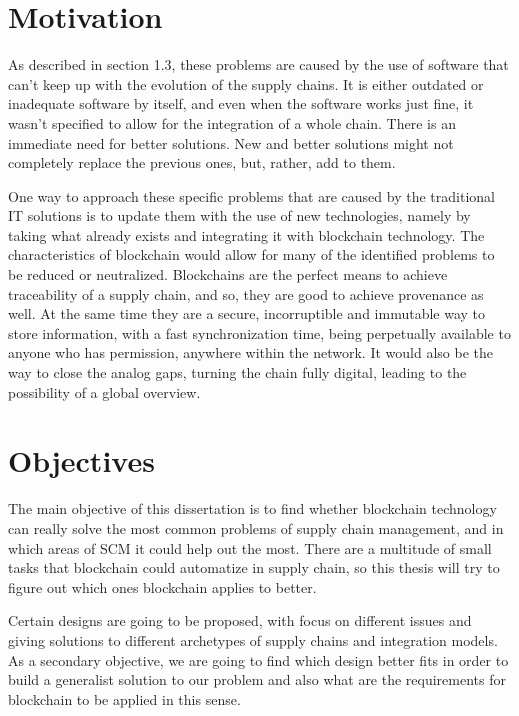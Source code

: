 
\section{Motivation} \label{sec:motivation}

As described in section 1.3, these problems are caused by the use of software that can't keep up with the evolution of the supply chains. It is either outdated or inadequate software by itself, and even when the software works just fine, it wasn't specified to allow for the integration of a whole chain. There is an immediate need for better solutions. New and better solutions might not completely replace the previous ones, but, rather, add to them.

One way to approach these specific problems that are caused by the traditional IT solutions is to update them with the use of new technologies, namely by taking what already exists and integrating it with blockchain technology. The characteristics of blockchain would allow for many of the identified problems to be reduced or neutralized. Blockchains are the perfect means to achieve traceability of a supply chain, and so, they are good to achieve provenance as well. At the same time they are a secure, incorruptible and immutable way to store information, with a fast synchronization time, being perpetually available to anyone who has permission, anywhere within the network. It would also be the way to close the analog gaps, turning the chain fully digital, leading to the possibility of a global overview.

\section{Objectives}
\label{sec:objectives}
The main objective of this dissertation is to find whether blockchain technology can really solve the most common problems of supply chain management, and in which areas of SCM it could help out the most. There are a multitude of small tasks that blockchain could automatize in supply chain, so this thesis will try to figure out which ones blockchain applies to better. 

Certain designs are going to be proposed, with focus on different issues and giving solutions to different archetypes of supply chains and integration models. As a secondary objective, we are going to find which design better fits in order to build a generalist solution to our problem and also what are the requirements for blockchain to be applied in this sense.

